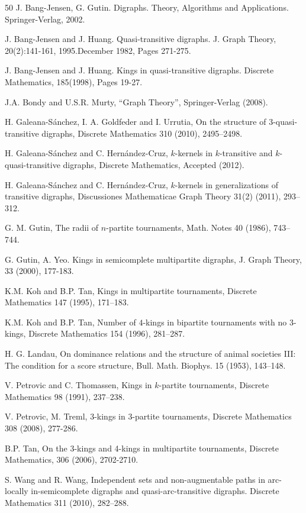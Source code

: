 \documentclass[preprint]{elsarticle}
\begin{document}
\begin{thebibliography}{50}
	J. Bang-Jensen, G. Gutin.  Digraphs.  Theory, Algorithms and 
	Applications.   Springer-Verlag, 2002.

	J. Bang-Jensen and J. Huang. Quasi-transitive digraphs. J. 
	Graph Theory, 20(2):141-161, 1995.December 1982, Pages 271-275.	

	J. Bang-Jensen and J. Huang. Kings in quasi-transitive digraphs. 
	Discrete Mathematics, 185(1998), Pages 19-27.
	
	J.A. Bondy and U.S.R. Murty, ``Graph Theory'', Springer-Verlag (2008).

 H. Galeana-S\'anchez, I. A. Goldfeder and I. Urrutia, On the structure of $3$-quasi-transitive digraphs,
	Discrete Mathematics 310 (2010), 2495--2498.

 H. Galeana-S\'anchez and C. Hern\' andez-Cruz, $k$-kernels in $k$-transitive and $k$-quasi-transitive digraphs,
	Discrete Mathematics, Accepted (2012).

 H. Galeana-S\'anchez and C. Hern\'andez-Cruz, $k$-kernels in generalizations of transitive digraphs,
	Discussiones Mathematicae Graph Theory 31(2) (2011), 293--312.

 G. M. Gutin, The radii of $n$-partite tournaments, Math. Notes 40 (1986), 743--744.

	G. Gutin, A. Yeo. Kings in semicomplete multipartite digraphs, J. Graph
	Theory, 33 (2000), 177-183.

 K.M. Koh and B.P. Tan, Kings in multipartite tournaments, Discrete Mathematics 147 (1995), 171--183.

 K.M. Koh and B.P. Tan, Number of $4$-kings in bipartite tournaments with no $3$-kings,
	Discrete Mathematics 154 (1996), 281--287.

 H. G. Landau, On dominance relations and the structure of animal societies III: The condition for a score structure,
	Bull. Math. Biophys. 15 (1953), 143--148.

	V. Petrovic and C. Thomassen, Kings in $k$-partite tournaments, Discrete Mathematics 98 (1991), 237--238.

	V. Petrovic, M. Treml, 3-kings in 3-partite tournaments, 
	Discrete Mathematics 308 (2008), 277-286.

	B.P. Tan, On the 3-kings and 4-kings in multipartite tournaments,
	Discrete Mathematics, 306 (2006), 2702-2710.

 S. Wang and R. Wang,   Independent sets and non-augmentable paths in arc-locally in-semicomplete digraphs
  and quasi-arc-transitive digraphs.  Discrete Mathematics 311 (2010), 282--288.
\end{thebibliography}
\end{document}
